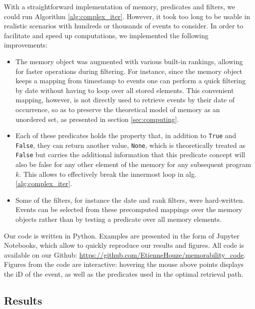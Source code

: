 \documentclass[entropy,article,submit,moreauthors,pdftex]{Definitions/mdpi}
\begin{document}
With a straightforward implementation of memory, predicates and filters, we could run Algorithm \ref{alg:complex_iter}. However, it took too
long to be usable in realistic scenarios with hundreds or thousands of events to
consider. In order to facilitate and speed up computations, we implemented
the following improvements:
\begin{itemize}
    \item The memory object was augmented with various built-in rankings, allowing
          for faster operations during filtering. For instance, since the memory
          object keeps a mapping from timestamp to events one can perform a quick
          filtering by date without having to loop over all stored elements. This convenient mapping,
          however, is not directly used to retrieve events by their date of occurrence, so as to
          preserve the theoretical model of memory as an unordered set, as presented in
          section \ref{sec:computing}.

    \item Each of these predicates holds the property that, in addition to
          \texttt{True} and \texttt{False}, they can return another value,
          \texttt{None}, which is theoretically treated as \texttt{False} but carries
          the additional information that this predicate concept will also be false for
          any other element of the memory for any subsequent program $k$. This allows to
          effectively break the innermost loop in alg. \ref{alg:complex_iter}.

    \item Some of the filters, for instance the date and rank filters, were
          hard-written. Events can be selected from these precomputed mappings over the memory objects
          rather than by testing a predicate over all memory elements.
\end{itemize}

Our code is written in Python. Examples are presented in the form of Jupyter Notebooks, which allow to quickly reproduce our results and figures. All code is available on our Github: \url{https://github.com/EtienneHouze/memorability_code}. Figures from the code are interactive: hovering the mouse above points displays the iD of the event, as well as the predicates used in the optimal retrieval path.


\subsection{Results}
\label{sec:example}
\end{document}
